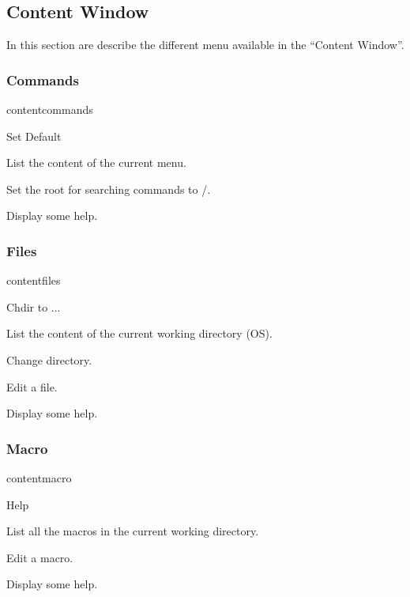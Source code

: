 \newpage

\subsection{Content Window}

In this section are describe the different menu available in the 
``Content Window''.

\subsubsection{Commands}

\begin{PAWf}[.55]{contentcommands}
\begin{DLsf}{Set Default}
\item[List]         List the content of the current menu.
\item[Set Default]  Set the root for searching commands to /.
\item[Help]         Display some help.
\end{DLsf}
\end{PAWf}

\subsubsection{Files}
\begin{PAWf}[.55]{contentfiles}
\begin{DLsf}{Chdir to ...}
\item[List]          List the content of the current working directory (OS).
\item[Chdir to ...]  Change directory.
\item[Edit]          Edit a file.
\item[Help]          Display some help.
\end{DLsf}
\end{PAWf}

\subsubsection{Macro}
\begin{PAWf}[.55]{contentmacro}
\begin{DLsf}{Help}
\item[List] List all the macros in the current working directory.
\item[Edit] Edit a macro.
\item[Help] Display some help.
\end{DLsf}
\end{PAWf}

